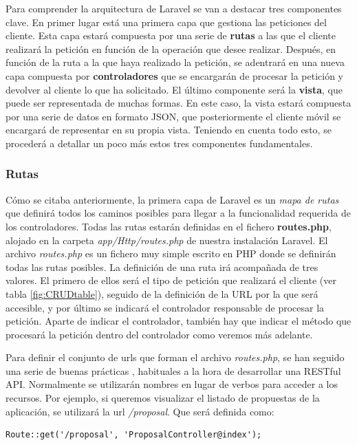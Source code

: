 Para comprender la arquitectura de Laravel se van a destacar tres componentes clave. En primer lugar está una primera capa que gestiona las peticiones del cliente. Esta capa estará compuesta por una serie de \textbf{rutas} a las que el cliente realizará la petición en función de la operación que desee realizar. Después, en función de la ruta a la que haya realizado la petición, se adentrará en una nueva capa compuesta por \textbf{controladores} que se encargarán de procesar la petición y devolver al cliente lo que ha solicitado. El último componente será la \textbf{vista}, que puede ser representada de muchas formas. En este caso, la vista estará compuesta por una serie de datos en formato JSON, que posteriormente el cliente móvil se encargará de representar en su propia vista. Teniendo en cuenta todo esto, se procederá a detallar un poco más estos tres componentes fundamentales.

\subsubsection{Rutas}

Cómo se citaba anteriormente, la primera capa de Laravel es un \textit{mapa de rutas} que definirá todos los caminos posibles para llegar a la funcionalidad requerida de los controladores. Todas las rutas estarán definidas en el fichero \textbf{routes.php}, alojado en la carpeta \textit{app/Http/routes.php} de nuestra instalación Laravel. El archivo \textit{routes.php} es un fichero muy simple escrito en PHP donde se definirán todas las rutas posibles. La definición de una ruta irá acompañada de tres valores. El primero de ellos será el tipo de petición que realizará el cliente (ver tabla \ref{fig:CRUDtable}), seguido de la definición de la URL por la que será accesible, y por último se indicará el controlador responsable de procesar la petición. Aparte de indicar el controlador, también hay que indicar el método que procesará la petición dentro del controlador como veremos más adelante.

Para definir el conjunto de urls que forman el archivo \textit{routes.php}, se han seguido una serie de buenas prácticas \cite{ref:practicesRESTful_API}, habituales a la hora de desarrollar una RESTful API. Normalmente se utilizarán nombres en lugar de verbos para acceder a los recursos. Por ejemplo, si queremos visualizar el listado de propuestas de la aplicación, se utilizará la url \textit{/proposal}. Que será definida como:	

\lstset{
   language        = php}
\begin{lstlisting}[frame=single]	
Route::get('/proposal', 'ProposalController@index');
\end{lstlisting}

